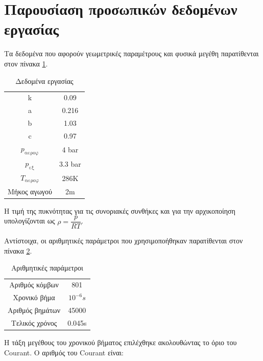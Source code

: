 \section{Παρουσίαση προσωπικών δεδομένων εργασίας}

Τα δεδομένα που αφορούν γεωμετρικές παραμέτρους και φυσικά μεγέθη παρατίθενται στον πίνακα \ref{tab:data}.

\begin{table}[h!]
    \begin{center}
        \begin{tabular}[c]{|c|c|}
            \hline
            k & 0.09 \\
            a & 0.216 \\
            b & 1.03 \\
            c & 0.97 \\
            $p_{\text{αεροφ}}$ & 4 bar\\
            $p_{\text{εξ}}$ & 3.3 bar\\
            $T_{\text{αεροφ}}$ & 286Κ\\
            Μήκος αγωγού & 2m\\
            \hline
        \end{tabular}
    \end{center}
    \caption{Δεδομένα εργασίας}
    \label{tab:data}
\end{table}

Η τιμή της πυκνότητας για τις συνοριακές συνθήκες και για την αρχικοποίηση υπολογίζονται ως $\rho = \dfrac{p}{RT}$.

Αντίστοιχα, οι αριθμητικές παράμετροι που χρησιμοποήθηκαν παρατίθενται στον πίνακα \ref{tab:num}.

\begin{table}[h!]
    \begin{center}
        \begin{tabular}[c]{|c|c|}
            \hline
            Αριθμός κόμβων & 801 \\
            Χρονικό βήμα & $10^{-6}s$ \\
            Αριθμός βημάτων & 45000 \\
            Τελικός χρόνος & 0.045s \\
            \hline
        \end{tabular}
    \end{center}
    \caption{Αριθμητικές παράμετροι}
    \label{tab:num}
\end{table}

Η τάξη μεγέθους του χρονικού βήματος επιλέχθηκε ακολουθώντας το όριο του Courant. Ο αριθμός του Courant είναι:

